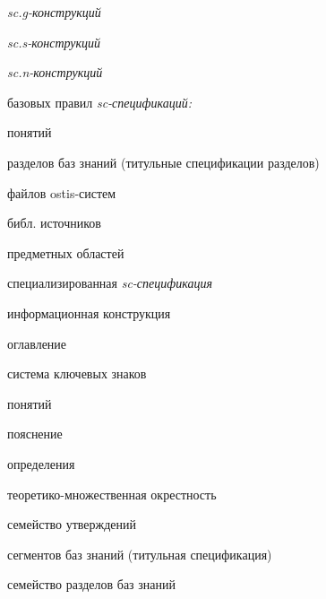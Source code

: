 \begin{SCn}
\begin{scnsubstruct}
{\begin{scnitemize}
                \item \textit{sc.g-конструкций}
                \item \textit{sc.s-конструкций}
                \item \textit{sc.n-конструкций}
                \item базовых правил \textit{sc-спецификаций:}
                    \begin{scnitemizeii}
                        \item понятий
                        \item разделов баз знаний (титульные спецификации разделов)
                        \item файлов ostis-систем
                        \item библ. источников
                        \item предметных областей
                    \end{scnitemizeii}
                \item специализированная \textit{sc-спецификация}
                    \begin{scnitemizeii}
                        \item информационная конструкция
                            \begin{scnitemizeiii}
                                \item оглавление
                                \item система ключевых знаков
                            \end{scnitemizeiii}
                        \item понятий
                            \begin{scnitemizeiii}
                                \item пояснение
                                \item определения
                                \item теоретико-множественная окрестность
                                \item семейство утверждений
                            \end{scnitemizeiii}
                        \item сегментов баз знаний (титульная спецификация)
                        \item семейство разделов баз знаний
                    \end{scnitemizeii}
            \end{scnitemize}}


\end{scnsubstruct}
\end{SCn}
